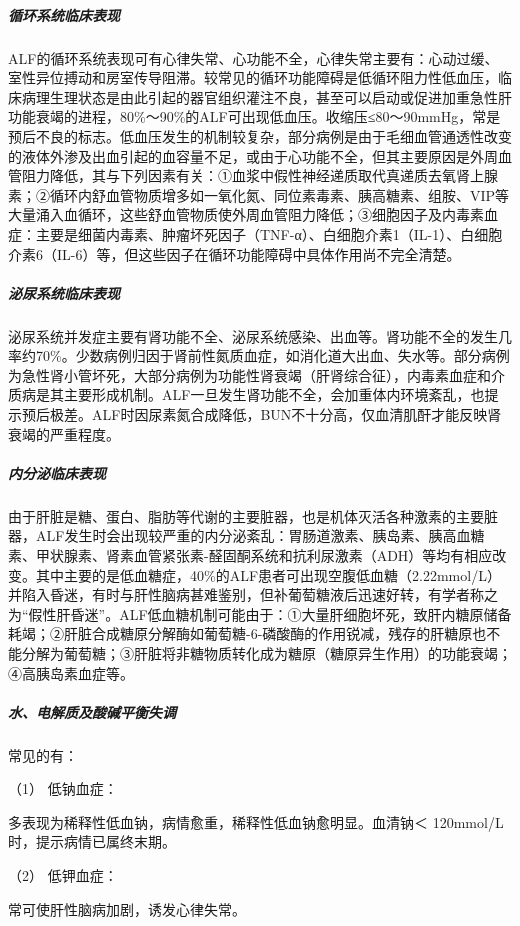 \subparagraph{循环系统临床表现}

ALF的循环系统表现可有心律失常、心功能不全，心律失常主要有：心动过缓、室性异位搏动和房室传导阻滞。较常见的循环功能障碍是低循环阻力性低血压，临床病理生理状态是由此引起的器官组织灌注不良，甚至可以启动或促进加重急性肝功能衰竭的进程，80\%～90\%的ALF可出现低血压。收缩压≤80～90mmHg，常是预后不良的标志。低血压发生的机制较复杂，部分病例是由于毛细血管通透性改变的液体外渗及出血引起的血容量不足，或由于心功能不全，但其主要原因是外周血管阻力降低，其与下列因素有关：①血浆中假性神经递质取代真递质去氧肾上腺素；②循环内舒血管物质增多如一氧化氮、同位素毒素、胰高糖素、组胺、VIP等大量涌入血循环，这些舒血管物质使外周血管阻力降低；③细胞因子及内毒素血症：主要是细菌内毒素、肿瘤坏死因子（TNF-α）、白细胞介素1（IL-1）、白细胞介素6（IL-6）等，但这些因子在循环功能障碍中具体作用尚不完全清楚。

\subparagraph{泌尿系统临床表现}

泌尿系统并发症主要有肾功能不全、泌尿系统感染、出血等。肾功能不全的发生几率约70\%。少数病例归因于肾前性氮质血症，如消化道大出血、失水等。部分病例为急性肾小管坏死，大部分病例为功能性肾衰竭（肝肾综合征），内毒素血症和介质病是其主要形成机制。ALF一旦发生肾功能不全，会加重体内环境紊乱，也提示预后极差。ALF时因尿素氮合成降低，BUN不十分高，仅血清肌酐才能反映肾衰竭的严重程度。

\subparagraph{内分泌临床表现}

由于肝脏是糖、蛋白、脂肪等代谢的主要脏器，也是机体灭活各种激素的主要脏器，ALF发生时会出现较严重的内分泌紊乱：胃肠道激素、胰岛素、胰高血糖素、甲状腺素、肾素血管紧张素-醛固酮系统和抗利尿激素（ADH）等均有相应改变。其中主要的是低血糖症，40\%的ALF患者可出现空腹低血糖（2.22mmol/L）并陷入昏迷，有时与肝性脑病甚难鉴别，但补葡萄糖液后迅速好转，有学者称之为“假性肝昏迷”。ALF低血糖机制可能由于：①大量肝细胞坏死，致肝内糖原储备耗竭；②肝脏合成糖原分解酶如葡萄糖-6-磷酸酶的作用锐减，残存的肝糖原也不能分解为葡萄糖；③肝脏将非糖物质转化成为糖原（糖原异生作用）的功能衰竭；④高胰岛素血症等。

\subparagraph{水、电解质及酸碱平衡失调}

常见的有：

\hypertarget{text00082.htmlux5cux23CHP3-6-2-2-1-2-7-1}{}
（1） 低钠血症：

多表现为稀释性低血钠，病情愈重，稀释性低血钠愈明显。血清钠＜
120mmol/L时，提示病情已属终末期。

\hypertarget{text00082.htmlux5cux23CHP3-6-2-2-1-2-7-2}{}
（2） 低钾血症：

常可使肝性脑病加剧，诱发心律失常。

